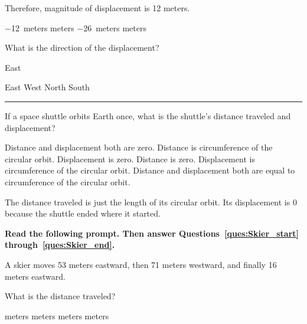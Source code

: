 \documentclass[]{exam}
\begin{document}
\begin{questions}
\begin{questions}
\begin{solution}
Therefore, magnitude of displacement is 12 meters.
\end{solution}

\begin{choices}
\choice \SI{-12}{meters}
 meters
\choice \SI{-26}{meters}
 meters
\end{choices}

\question \label{ques:cat_end}
What is the direction of the displacement?

\begin{solution}
East
\end{solution}

\begin{choices}
\CorrectChoice East
\choice West
\choice North
\choice South
\end{choices}

\vspace{1em} \hrule

\question
If a space shuttle orbits Earth once, what is the shuttle’s distance traveled and displacement?

\begin{choices}
\choice Distance and displacement both are zero.
\CorrectChoice Distance is circumference of the circular orbit. Displacement is zero.
\choice Distance is zero. Displacement is circumference of the circular orbit.
\choice Distance and displacement both are equal to circumference of the circular orbit.
\end{choices}

\begin{solution}
The distance traveled is just the length of its circular orbit. Its displacement is 0 because the shuttle ended where it started.
\end{solution}

\begin{EnvUplevel}
\textbf{Read the following prompt. Then answer Questions~\ref{ques:Skier_start} through~\ref{ques:Skier_end}.}

A skier moves 53 meters eastward, then 71 meters westward, and finally 16 meters eastward. 
\end{EnvUplevel}


\question \label{ques:Skier_start}
What is the distance traveled?

\begin{choices}
 meters
 meters
 meters
 meters
\end{choices}


\end{questions}
\end{questions}
\end{document}
